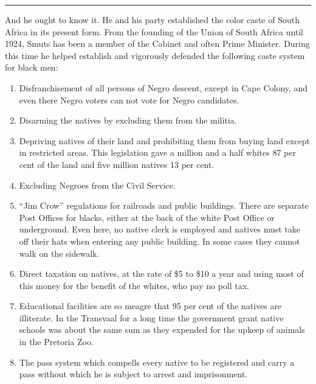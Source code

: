 \documentclass[letterpaper,10pt,english]{jupyterBook}
\begin{document}
\bigskip\hrule\bigskip


\sphinxAtStartPar
And he ought to know it. He and his party established the color caste of South Africa in its present form. From the founding of the Union of South Africa until 1924, Smuts has been a member of the Cabinet and often Prime Minister. During this time he helped establish and vigorously defended the following caste system for black men:
\begin{enumerate}
%
\item {} 
\sphinxAtStartPar
Disfranchisement of all persons of Negro descent, except in Cape Colony, and even there Negro voters can not vote for Negro candidates.

\item {} 
\sphinxAtStartPar
Disarming the natives by excluding them from the militia.

\item {} 
\sphinxAtStartPar
Depriving natives of their land and prohibiting them from buying land except in restricted areas. This legislation gave a million and a half whites 87 per cent of the land and five million natives 13 per cent.

\item {} 
\sphinxAtStartPar
Excluding Negroes from the Civil Service.

\item {} 
\sphinxAtStartPar
“Jim Crow” regulations for railroads and public buildings. There are separate Post Offices for blacks, either at the back of the white Post Office or underground. Even here, no native clerk is employed and natives must take off their hats when entering any public building. In some cases they cannot walk on the sidewalk.

\item {} 
\sphinxAtStartPar
Direct taxation on natives, at the rate of \$5 to \$10 a year and using most of this money for the benefit of the whites, who pay no poll tax.

\item {} 
\sphinxAtStartPar
Educational facilities are so meagre that 95 per cent of the natives are illiterate. In the Transvaal for a long time the government grant native schools was about the same sum as they expended for the upkeep of animals in the Pretoria Zoo.

\item {} 
\sphinxAtStartPar
The pass system which compells every native to be registered and carry a pass without which he is subject to arrest and imprisonment.

\end{enumerate}
\end{document}
